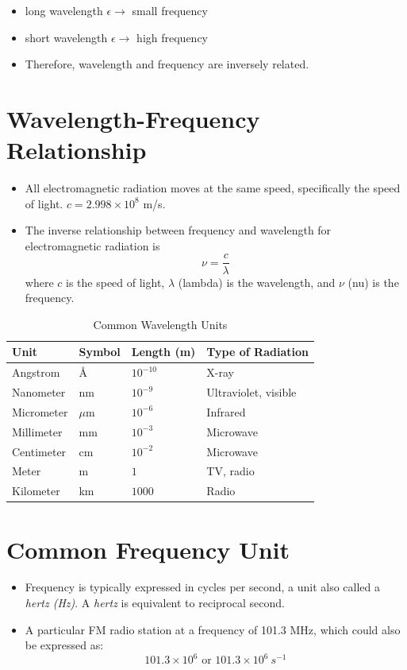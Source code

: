 \documentclass[
	chapter=7,
	title={Quantum Theory {\&} the Electronic Structure of Atoms},
	showanswers=true,
]{chem122notes}
\begin{document}
\begin{itemize}
	\item long wavelength $\epsilon \rightarrow$ small frequency
	\item short wavelength $\epsilon \rightarrow$ high frequency
	\item Therefore, wavelength and frequency are inversely related.
\end{itemize}

\section{Wavelength-Frequency Relationship}\label{sec:wavelength-frequency-relationship}
\begin{itemize}
	\item All electromagnetic radiation moves at the same speed, specifically the speed of light. $c = 2.998 \times 10^{8}$ m/s.
	\item The inverse relationship between frequency and wavelength for electromagnetic radiation is
	\begin{equation}
		\nu = \frac{c}{\lambda}
		\label{eq:wavelength-frequency-relationship}
	\end{equation}
	where $c$ is the speed of light, $\lambda$ (lambda) is the wavelength, and $\nu$ (nu) is the frequency.
\end{itemize}

\begin{table}
	\centering
	\caption{Common Wavelength Units}
	\label{tab:common-wavelength-units}
	\begin{tabular}{llll}
		\textbf{Unit} & \textbf{Symbol} & \textbf{Length (m)} & \textbf{Type of Radiation}\\
		\hline
		Angstrom & \si{\angstrom} & $10^{-10}$ & X-ray\\
		Nanometer & nm & $10^{-9}$ & Ultraviolet, visible\\
		Micrometer & $\mu$m & $10^{-6}$ & Infrared\\
		Millimeter & mm & $10^{-3}$ & Microwave\\
		Centimeter & cm & $10^{-2}$ & Microwave\\
		Meter & m & $1$ & TV, radio\\
		Kilometer & km & $1000$ & Radio\\
	\end{tabular}
\end{table}

\section{Common Frequency Unit}\label{sec:common-frequency-unit}
\begin{itemize}
	\item Frequency is typically expressed in cycles per second, a unit also called a \emph{hertz (Hz)}. A \emph{hertz} is equivalent to reciprocal second.
	\item A particular FM radio station at a frequency of 101.3 MHz, which could also be expressed as:
	\[ 101.3 \times 10^{6} \mbox{ or } 101.3 \times 10^{6}\ s^{-1} \]
\end{itemize}
\end{document}

